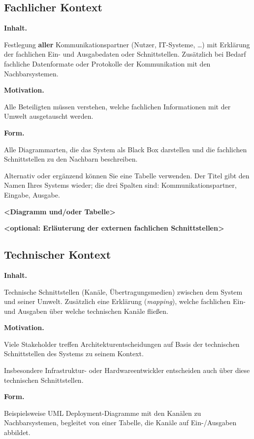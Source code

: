 \documentclass[]{article}
\begin{document}
\subsection{Fachlicher Kontext}\label{_fachlicher_kontext}

\textbf{Inhalt.}

Festlegung \textbf{aller} Kommunikationspartner (Nutzer, IT-Systeme,
\ldots{}) mit Erklärung der fachlichen Ein- und Ausgabedaten oder
Schnittstellen. Zusätzlich bei Bedarf fachliche Datenformate oder
Protokolle der Kommunikation mit den Nachbarsystemen.

\textbf{Motivation.}

Alle Beteiligten müssen verstehen, welche fachlichen Informationen mit
der Umwelt ausgetauscht werden.

\textbf{Form.}

Alle Diagrammarten, die das System als Black Box darstellen und die
fachlichen Schnittstellen zu den Nachbarn beschreiben.

Alternativ oder ergänzend können Sie eine Tabelle verwenden. Der Titel
gibt den Namen Ihres Systems wieder; die drei Spalten sind:
Kommunikationspartner, Eingabe, Ausgabe.

\textbf{\textless{}Diagramm und/oder Tabelle\textgreater{}}

\textbf{\textless{}optional: Erläuterung der externen fachlichen
Schnittstellen\textgreater{}}

\subsection{Technischer Kontext}\label{_technischer_kontext}

\textbf{Inhalt.}

Technische Schnittstellen (Kanäle, Übertragungsmedien) zwischen dem
System und seiner Umwelt. Zusätzlich eine Erklärung (\emph{mapping}),
welche fachlichen Ein- und Ausgaben über welche technischen Kanäle
fließen.

\textbf{Motivation.}

Viele Stakeholder treffen Architekturentscheidungen auf Basis der
technischen Schnittstellen des Systems zu seinem Kontext.

Insbesondere Infrastruktur- oder Hardwareentwickler entscheiden auch
über diese technischen Schnittstellen.

\textbf{Form.}

Beispielsweise UML Deployment-Diagramme mit den Kanälen zu
Nachbarsystemen, begleitet von einer Tabelle, die Kanäle auf
Ein-/Ausgaben abbildet.
\end{document}
